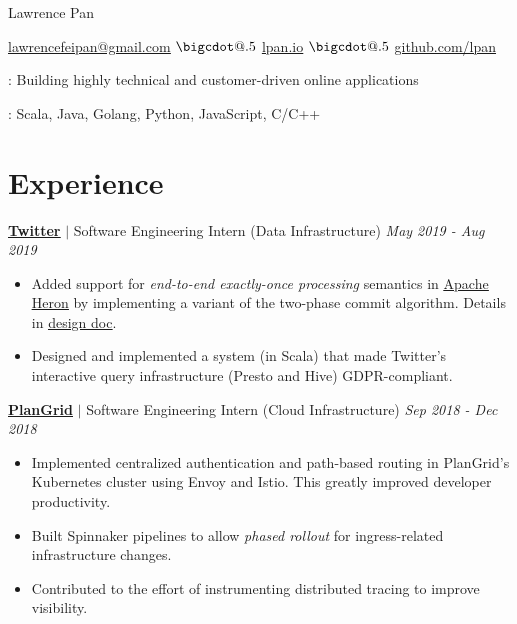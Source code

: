\documentclass[paper=a4,fontsize=15pt]{scrartcl}
\makeatletter
\newcommand*\bigcdot{\mathpalette\bigcdot@{.5}}
\newcommand*\bigcdot@[2]{\mathbin{\vcenter{\hbox{\scalebox{#2}{$\m@th#1\bullet$}}}}}
\newcommand{\smolboispace}{\vspace*{0.1em}}
\newcommand{\halfspace}{\vspace*{0.5em}}
\newcommand{\bighalfspace}{\vspace*{0.75em}}
\newcommand{\http}[1]{\href{http://#1}{\ul{#1}}}
\newcommand{\https}[1]{\href{https://#1}{\ul{#1}}}
\newcommand{\email}[1]{\href{mailto:#1}{\ul{#1}}}
\newcommand*{\newsummary}[2]{
  \noindent\hangafter=0\small
  {\capitalisewords{\textbf{#1}}: #2 \par}
}
\makeatother
\begin{document}
\begin{center}
  {\fontsize{35}{40}\selectfont Lawrence Pan \par}
  \halfspace

  {\normalsize
    \email{lawrencefeipan@gmail.com}
    $\bigcdot$ \http{lpan.io}
    $\bigcdot$ \https{github.com/lpan}
    \par}
\end{center}

\newsummary{Interest}{Building highly technical and customer-driven online applications}
\smolboispace
\newsummary{languages}{Scala, Java, Golang, Python, JavaScript, C/C++}

\section*{Experience}{}
\normalsize
\noindent \href{https://twitter.com}{\textbf{\ul{Twitter}}}
$\vert$ \small Software Engineering Intern (Data Infrastructure)
{\hfill \footnotesize \textit{May 2019 - Aug 2019}}
\begin{itemize}[noitemsep,leftmargin=20pt,label=\raisebox{0.25ex}{\tiny$\bullet$},topsep=5pt]
  \small
  \item Added support for \textit{end-to-end exactly-once processing} semantics
    in \href{https://apache.github.io/incubator-heron/}{\ul{Apache Heron}} by
    implementing a variant of the two-phase commit algorithm. Details in
    \href{https://docs.google.com/document/d/1Shqp2z-uAhsOUN2erbc2d-72wdjA8anp}{\ul{design
        doc}}.
  \item Designed and implemented a system (in Scala) that made Twitter's
    interactive query infrastructure (Presto and Hive) GDPR-compliant.
\end{itemize}

\bighalfspace
\normalsize
\noindent \href{https://plangrid.com}{\textbf{\ul{PlanGrid}}}
$\vert$ \small Software Engineering Intern (Cloud Infrastructure)
{\hfill \footnotesize \textit{Sep 2018 - Dec 2018}}
\begin{itemize}[noitemsep,leftmargin=20pt,label=\raisebox{0.25ex}{\tiny$\bullet$},topsep=5pt]
  \small
  \item Implemented centralized authentication and path-based routing in
    PlanGrid's Kubernetes cluster using Envoy and Istio. This greatly improved
    developer productivity.
  \item Built Spinnaker pipelines to allow \textit{phased rollout} for
    ingress-related infrastructure changes.
  \item Contributed to the effort of instrumenting distributed tracing to
    improve visibility.
\end{itemize}
\end{document}
